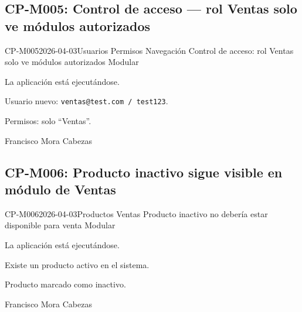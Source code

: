 \subsection{CP-M005: Control de acceso --- rol Ventas solo ve módulos autorizados}
\def\cpPasos{%
  \item Crear usuario \texttt{ventas@test.com} con solo permiso ``Ventas''.
  \item Cerrar sesión.
  \item Iniciar sesión con \texttt{ventas@test.com / test123}.
  \item Observar el menú lateral.}
\def\cpResultadoE{%
  \item Solo aparecen módulos de ventas: Inicio, Inventario, Ventas, Estadísticas, Reportes.}
\def\cpResultadoO{El menú mostró exactamente 5 secciones: Inicio, Inventario, Ventas,
  Estadísticas y Reportes. Los módulos Usuarios, Productos, Categorías, Emprendimientos,
  Emprendedoras, Actividades y Asociación no son visibles.}
\casoprueba
  {CP-M005}{2026-04-03}{Usuarios \arr{} Permisos \arr{} Navegación}
  {Control de acceso: rol Ventas solo ve módulos autorizados}
  {Modular}{\estadoAprobado}
  {\item La aplicación está ejecutándose.}
  {\item Usuario nuevo: \texttt{ventas@test.com / test123}.
   \item Permisos: solo ``Ventas''.}
  {Francisco Mora Cabezas}

\subsection{CP-M006: Producto inactivo sigue visible en módulo de Ventas}
\def\cpPasos{%
  \item Navegar a ``Productos'' \arr{} editar un producto \arr{} estado a inactivo.
  \item Navegar a ``Ventas'' \arr{} nueva venta.
  \item Buscar el producto inactivo en el selector.}
\def\cpResultadoE{%
  \item El producto inactivo NO aparece disponible para seleccionar en ventas.}
\def\cpResultadoO{\textcolor{rojo}{El producto inactivo SÍ aparece disponible en el
  selector de ventas. Bug: el filtro de productos activos no se aplica en el módulo
  de ventas.} (Ver HAL-001)}
\casoprueba
  {CP-M006}{2026-04-03}{Productos \arr{} Ventas}
  {Producto inactivo no debería estar disponible para venta}
  {Modular}{\estadoFallido}
  {\item La aplicación está ejecutándose.
   \item Existe un producto activo en el sistema.}
  {\item Producto marcado como inactivo.}
  {Francisco Mora Cabezas}


